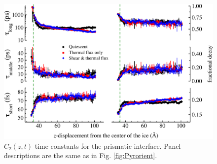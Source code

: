 \begin{figure}
\includegraphics[width=\linewidth]{Figures/Pri_lcorrz}
\caption{\label{fig:Porient} $C_2(z,t)$ time constants for the prismatic
  interface.  Panel descriptions are the same as in
  Fig. \ref{fig:Pyrorient}.}
\end{figure}

